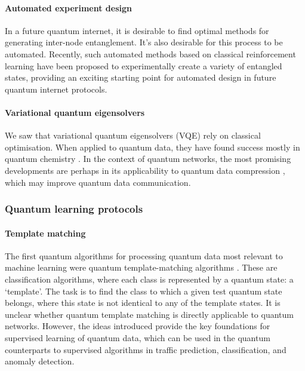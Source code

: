 \paragraph{Automated experiment design}

In a future quantum internet, it is desirable to find optimal methods for generating inter-node entanglement. It's also desirable for this process to be automated. Recently, such automated methods based on classical reinforcement learning \cite{bib:alexey} have been proposed to experimentally create a variety of entangled states, providing an exciting starting point for automated design in future quantum internet protocols.

\paragraph{Variational quantum eigensolvers}

We saw that variational quantum eigensolvers (VQE) rely on classical optimisation. When applied to quantum data, they have found success mostly in quantum chemistry \cite{bib:peruzzo2014peruzzo, bib:moll2018quantum}. In the context of quantum networks, the most promising developments are perhaps in its applicability to quantum data compression \cite{bib:jonromero}, which may improve quantum data communication.

\subsubsection{Quantum learning protocols}

\paragraph{Template matching}

The first quantum algorithms for processing quantum data most relevant to machine learning were quantum template-matching algorithms \cite{bib:sasaki1, bib:sasaki2}. These are classification algorithms, where each class is represented by a quantum state: a `template'. The task is to find the class to which a given test quantum state belongs, where this state is not identical to any of the template states. It is unclear whether quantum template matching is directly applicable to quantum networks. However, the ideas introduced provide the key foundations for supervised learning of quantum data, which can be used in the quantum counterparts to supervised algorithms in traffic prediction, classification, and anomaly detection.

